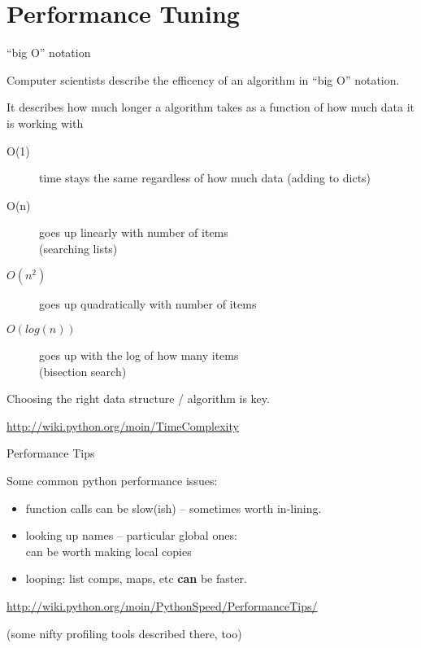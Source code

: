\documentclass{beamer}
\begin{document}
\section{Performance Tuning}


\begin{frame}[fragile]{``big O'' notation}

\vfill
{\Large Computer scientists describe the efficency of an algorithm in ``big O'' notation.}

\vfill
{\Large It describes how much longer a algorithm takes as a function of how much data it is working with}

\vfill
\begin{description}
  \item[O(1)] time stays the same regardless of how much data (adding to dicts)
  \item[O(n)] goes up linearly with number of items\\
              (searching lists)
  \item[$O(n^2)$] goes up quadratically with number of items\\
  \item[$O(log(n))$] goes up with the log of how many items\\
                     (bisection search)
\end{description}

Choosing the right data structure / algorithm is key.

\url{http://wiki.python.org/moin/TimeComplexity}

\end{frame} 


\begin{frame}[fragile]{Performance Tips}

\vfill
{\Large Some common python performance issues:}

\begin{itemize}
  \item function calls can be slow(ish) -- sometimes worth in-lining.
  \item looking up names -- particular global ones:\\
        can be worth making local copies
  \item looping: list comps, maps, etc {\bf can} be faster.
\end{itemize}

\vfill
\url{http://wiki.python.org/moin/PythonSpeed/PerformanceTips/}

\vfill
(some nifty profiling tools described there, too)

\end{frame} 
\end{document}
